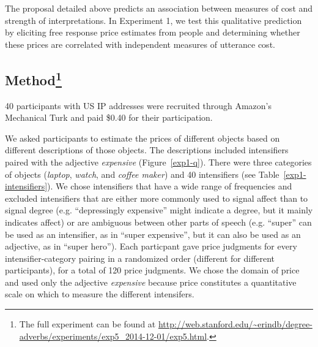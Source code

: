 \documentclass[10pt,letterpaper]{article}
\newcommand{\w}[1]{\emph{#1}}
\newcommand{\todo}[1]{{\color{red}#1}}
\begin{document}
The proposal detailed above predicts an association between measures of cost and strength of interpretations. In Experiment 1, we test this qualitative prediction %
by eliciting free response price estimates from people and determining whether these prices are correlated with independent measures of utterance cost.

\subsection{Method\footnote{The full experiment can be found at \url{http://web.stanford.edu/~erindb/degree-adverbs/experiments/exp5_2014-12-01/exp5.html}.}}

40 participants with US IP addresses were recruited through Amazon's Mechanical Turk and paid \$0.40 for their participation.

We asked participants to estimate the prices of different objects based on different descriptions of those objects. The descriptions included intensifiers paired with the adjective \w{expensive} (Figure~\ref{exp1-q}).
There were three categories of objects (\emph{laptop}, \emph{watch}, and \emph{coffee maker}) and 40 intensifiers (see Table~\ref{exp1-intensifiers}).
We chose intensifiers that have a wide range of frequencies and excluded intensifiers that are either more commonly used to signal affect than to signal degree (e.g. ``depressingly expensive'' might indicate a degree, but it mainly indicates affect) or are ambiguous between other parts of speech (e.g. ``super'' can be used as an intensifier, as in ``super expensive'', but it can also be used as an adjective, as in ``super hero'').
Each particpant gave price judgments for every intensifier-category pairing in a randomized order (different for different participants), for a total of 120 price judgments.
We chose the domain of price and used only the adjective \w{expensive} because price constitutes a quantitative scale on which to measure the different intensifers.%
\end{document}
